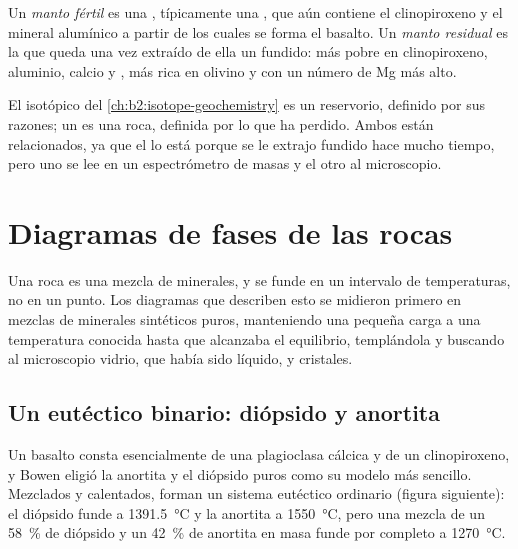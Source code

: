 \begin{definition}\label{def:b2:mantle-melting:fertility}
Un \emph{manto fértil} es una , típicamente una
, que aún contiene el clinopiroxeno y el mineral alumínico a partir de los
cuales se forma el basalto. Un \emph{manto residual} es la
 que queda una vez extraído de ella un fundido: más pobre en
clinopiroxeno, aluminio, calcio y , más rica en
olivino y con un número de Mg más alto.
\end{definition}

El  isotópico del \cref{ch:b2:isotope-geochemistry} es un reservorio,
definido por sus razones; un  es una roca, definida por lo que ha perdido.
Ambos están relacionados, ya que el  lo está porque se le extrajo
fundido hace mucho tiempo, pero uno se lee en un espectrómetro de masas y el otro
al microscopio.

\section{Diagramas de fases de las rocas}\label{sec:b2:mantle-melting:diagrams}

Una roca es una mezcla de minerales, y se funde en un intervalo de temperaturas, no en
un punto. Los diagramas que describen esto se midieron primero en mezclas de
minerales sintéticos puros, manteniendo una pequeña carga a una temperatura conocida hasta que
alcanzaba el equilibrio, templándola y buscando al microscopio vidrio,
que había sido líquido, y cristales.

\subsection*{Un eutéctico binario: diópsido y anortita}

Un basalto consta esencialmente de una plagioclasa cálcica y de un clinopiroxeno, y
Bowen eligió la anortita y el diópsido puros como su modelo más sencillo. Mezclados y calentados,
forman un sistema
eutéctico ordinario (figura siguiente): el diópsido funde a \qty{1391.5}{\celsius} y la anortita
a \qty{1550}{\celsius}, pero una mezcla de un \qty{58}{\percent} de diópsido y un
\qty{42}{\percent} de anortita en masa funde por completo a \qty{1270}{\celsius}.

